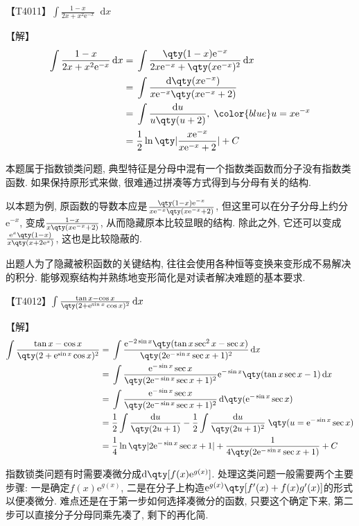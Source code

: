 \documentclass{ctexbook}
\newcommand{\e}{\mathrm{e}}
\newcommand*{\dif}{\mathop{}\!\mathrm{d}}
\begin{document}
{【T4011】$\int\frac{1-x}{2x+x^{2}\e^{-x}}\dif{x}$\par
【解】
\begin{align*}
\int\frac{1-x}{2x+x^{2}\e^{-x}}\dif{x}={}&\int\frac{\qty(1-x)\e^{-x}}{2x\e^{-x}+\qty(x\e^{-x})^{2}}\dif{x}\\
={}&\int\frac{\dif{\qty(x\e^{-x})}}{x\e^{-x}\qty(x\e^{-x}+2)}\\
={}&\int\frac{\dif{u}}{u\qty(u+2)},\;{\color{blue}u=x\e^{-x}}\\
={}&\frac{1}{2}\ln\qty|\frac{x\e^{-x}}{x\e^{-x}+2}|+C
\end{align*}\par
{\kaishu 本题属于指数锁类问题, 典型特征是分母中混有一个指数类函数而分子没有指数类函数. 如果保持原形式来做, 很难通过拼凑等方式得到与分母有关的结构. \par
以本题为例, 原函数的导数本应是$\frac{\qty(1-x)\e^{-x}}{x\e^{-x}\qty(x\e^{-x}+2)}$, 但这里可以在分子分母上约分$\e^{-x}$, 变成$\frac{1-x}{x\qty(x\e^{-x}+2)}$, 从而隐藏原本比较显眼的结构. 除此之外, 它还可以变成$\frac{\e^{x}\qty(1-x)}{x\qty(x+2\e^{x})}$, 这也是比较隐蔽的. \par
出题人为了隐藏被积函数的关键结构, 往往会使用各种恒等变换来变形成不易解决的积分. 能够观察结构并熟练地变形简化是对读者解决难题的基本要求. \par}
【T4012】$\int\frac{\tan{x}-\cos{x}}{\qty(2+\e^{\sin{x}}\cos{x})^{2}}\dif{x}$\par
【解】
\begin{align*}
\int\frac{\tan{x}-\cos{x}}{\qty(2+\e^{\sin{x}}\cos{x})^{2}}={}&\int\frac{\e^{-2\sin{x}}\qty(\tan{x}\sec^{2}{x}-\sec{x})}{\qty(2\e^{-\sin{x}}\sec{x}+1)^{2}}\dif{x}\\
={}&\int\frac{\e^{-\sin{x}}\sec{x}}{\qty(2\e^{-\sin{x}}\sec{x}+1)^{2}}\e^{-\sin{x}}\qty(\tan{x}\sec{x}-1)\dif{x}\\
={}&\int\frac{\e^{-\sin{x}}\sec{x}}{\qty(2\e^{-\sin{x}}\sec{x}+1)^{2}}\dif{\qty(\e^{-\sin{x}}\sec{x})}\\
={}&\frac{1}{2}\int\frac{\dif{u}}{\qty(2u+1)}-\frac{1}{2}\int\frac{\dif{u}}{\qty(2u+1)^{2}}\;\qty(u=\e^{-\sin{x}}\sec{x})\\
={}&\frac{1}{4}\ln\qty|2\e^{-\sin{x}}\sec{x}+1|+\frac{1}{4\qty(2\e^{-\sin{x}}\sec{x}+1)}+C
\end{align*}\par
{\kaishu 指数锁类问题有时需要凑微分成$\dif{\qty[f(x)\e^{g(x)}]}$. 处理这类问题一般需要两个主要步骤: 一是确定$f(x)\e^{g(x)}$, 二是在分子上构造$\e^{g(x)}\qty[f'(x)+f(x)g'(x)]$的形式以便凑微分. 难点还是在于第一步如何选择凑微分的函数, 只要这个确定下来, 第二步可以直接分子分母同乘先凑了, 剩下的再化简. \par
}}
\end{document}
